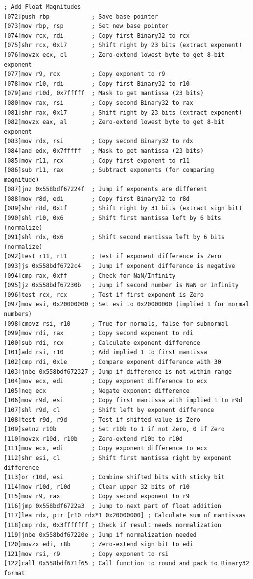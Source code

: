\documentclass[12pt,letter]{article}
\begin{document}
\begin{lstlisting}[style=rust, caption={Annotated Binary32 Normal Case Subtraction Instruction Trace}, label={fig:ieee_subtract}]
; Add Float Magnitudes
[072]push rbp            ; Save base pointer
[073]mov rbp, rsp        ; Set new base pointer
[074]mov rcx, rdi        ; Copy first Binary32 to rcx
[075]shr rcx, 0x17       ; Shift right by 23 bits (extract exponent)
[076]movzx ecx, cl       ; Zero-extend lowest byte to get 8-bit exponent
[077]mov r9, rcx         ; Copy exponent to r9
[078]mov r10, rdi        ; Copy first Binary32 to r10
[079]and r10d, 0x7fffff  ; Mask to get mantissa (23 bits)
[080]mov rax, rsi        ; Copy second Binary32 to rax
[081]shr rax, 0x17       ; Shift right by 23 bits (extract exponent)
[082]movzx eax, al       ; Zero-extend lowest byte to get 8-bit exponent
[083]mov rdx, rsi        ; Copy second Binary32 to rdx
[084]and edx, 0x7fffff   ; Mask to get mantissa (23 bits)
[085]mov r11, rcx        ; Copy first exponent to r11
[086]sub r11, rax        ; Subtract exponents (for comparing magnitude)
[087]jnz 0x558bdf67224f  ; Jump if exponents are different
[088]mov r8d, edi        ; Copy first Binary32 to r8d
[089]shr r8d, 0x1f       ; Shift right by 31 bits (extract sign bit)
[090]shl r10, 0x6        ; Shift first mantissa left by 6 bits (normalize)
[091]shl rdx, 0x6        ; Shift second mantissa left by 6 bits (normalize)
[092]test r11, r11       ; Test if exponent difference is Zero
[093]js 0x558bdf6722c4   ; Jump if exponent difference is negative
[094]cmp rax, 0xff       ; Check for NaN/Infinity
[095]jz 0x558bdf67230b   ; Jump if second number is NaN or Infinity
[096]test rcx, rcx       ; Test if first exponent is Zero
[097]mov esi, 0x20000000 ; Set esi to 0x20000000 (implied 1 for normal numbers)
[098]cmovz rsi, r10      ; True for normals, false for subnormal
[099]mov rdi, rax        ; Copy second exponent to rdi
[100]sub rdi, rcx        ; Calculate exponent difference
[101]add rsi, r10        ; Add implied 1 to first mantissa
[102]cmp rdi, 0x1e       ; Compare exponent difference with 30
[103]jnbe 0x558bdf672327 ; Jump if difference is not within range
[104]mov ecx, edi        ; Copy exponent difference to ecx
[105]neg ecx             ; Negate exponent difference
[106]mov r9d, esi        ; Copy first mantissa with implied 1 to r9d
[107]shl r9d, cl         ; Shift left by exponent difference
[108]test r9d, r9d       ; Test if shifted value is Zero
[109]setnz r10b          ; Set r10b to 1 if not Zero, 0 if Zero
[110]movzx r10d, r10b    ; Zero-extend r10b to r10d
[111]mov ecx, edi        ; Copy exponent difference to ecx
[112]shr esi, cl         ; Shift first mantissa right by exponent difference
[113]or r10d, esi        ; Combine shifted bits with sticky bit
[114]mov r10d, r10d      ; Clear upper 32 bits of r10
[115]mov r9, rax         ; Copy second exponent to r9
[116]jmp 0x558bdf6722a3  ; Jump to next part of float addition
[117]lea rdx, ptr [r10 rdx*1 0x20000000] ; Calculate sum of mantissas
[118]cmp rdx, 0x3fffffff ; Check if result needs normalization
[119]jnbe 0x558bdf67220e ; Jump if normalization needed
[120]movzx edi, r8b      ; Zero-extend sign bit to edi
[121]mov rsi, r9         ; Copy exponent to rsi
[122]call 0x558bdf671f65 ; Call function to round and pack to Binary32 format


\end{lstlisting}
\end{document}
